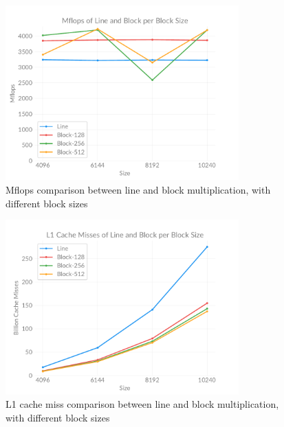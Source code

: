     \begin{figure}[h]
        \centering
        \captionsetup{justification=centering, margin=2cm}
        \includegraphics[width=0.8\textwidth]{pdf/line-block-flops}
        \caption{Mflops comparison between line and block multiplication, with different block sizes}
        \label{fig:chart:line-block-flops}
    \end{figure}

    \begin{figure}[h]
        \centering
        \captionsetup{justification=centering, margin=2cm}
        \includegraphics[width=0.8\textwidth]{pdf/line-block-l1}
        \caption{L1 cache miss comparison between line and block multiplication, with different block sizes}
        \label{fig:chart:line-block-l1}
    \end{figure}

